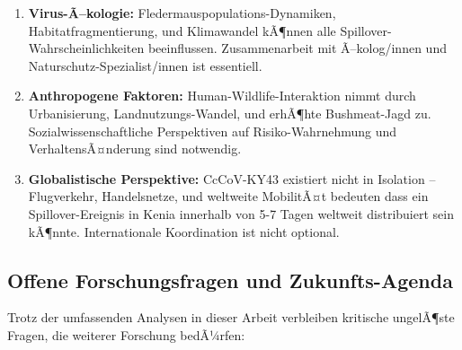 ﻿\documentclass[11pt,a4paper]{article}
\theoremstyle{definition}
\begin{document}
\begin{enumerate}
\item \textbf{Virus-Ã–kologie:} Fledermauspopulations-Dynamiken, Habitatfragmentierung, und Klimawandel kÃ¶nnen alle Spillover-Wahrscheinlichkeiten beeinflussen. Zusammenarbeit mit Ã–kolog/innen und Naturschutz-Spezialist/innen ist essentiell.

\item \textbf{Anthropogene Faktoren:} Human-Wildlife-Interaktion nimmt durch Urbanisierung, Land\-nutzungs-Wandel, und erhÃ¶hte Bushmeat-Jagd zu. Sozialwissenschaftliche Perspektiven auf Risiko-Wahrnehmung und VerhaltensÃ¤nderung sind notwendig.

\item \textbf{Globalistische Perspektive:} CcCoV-KY43 existiert nicht in Isolation -- Flugverkehr, Handelsnetze, und weltweite MobilitÃ¤t bedeuten dass ein Spillover-Ereignis in Kenia innerhalb von 5-7 Tagen weltweit distribuiert sein kÃ¶nnte. Internationale Koordination ist nicht optional.
\end{enumerate}

\subsection{Offene Forschungsfragen und Zukunfts-Agenda}

Trotz der umfassenden Analysen in dieser Arbeit verbleiben kritische ungelÃ¶ste Fragen, die weiterer Forschung bedÃ¼rfen:
\end{document}
